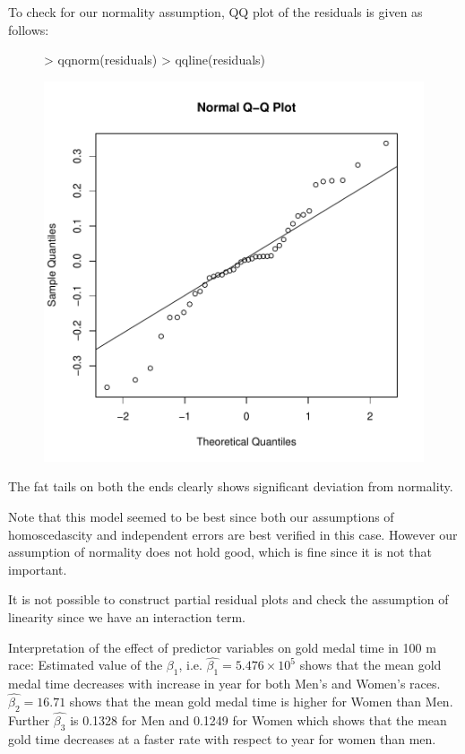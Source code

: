 \documentclass[12pt]{article}
\begin{document}
\clearpage
To check for our normality assumption, QQ plot of the residuals is given as follows:
\begin{figure}[H]
\begin{Schunk}
\begin{Sinput}
> qqnorm(residuals)
> qqline(residuals)
\end{Sinput}
\end{Schunk}
\includegraphics{HW4-019}
\end{figure}
The fat tails on both the ends clearly shows significant deviation from normality.

Note that this model seemed to be best since both our assumptions of homoscedascity and independent errors are best verified in this case. However our assumption of normality does not hold good, which is fine since it is not that important.

It is not possible to construct partial residual plots and check the assumption of linearity since we have an interaction term.

Interpretation of the effect of predictor variables on gold medal time in 100 m race: Estimated value of the $\beta_1$, i.e. $\hat{\beta_1}= 5.476 \times 10^5$ shows that the mean gold medal time decreases with increase in year for both Men's and Women's races. $\hat{\beta_2}= 16.71$ shows that the mean gold medal time is higher for Women than Men. Further $\hat{\beta_3}$ is 0.1328 for Men and 0.1249 for Women which shows that the mean gold time decreases at a faster rate with respect to year for women than men.
\end{document}
